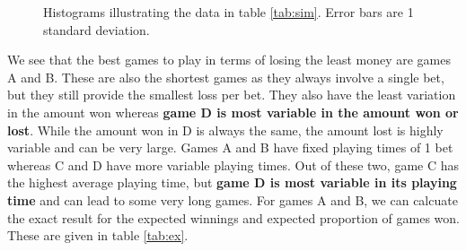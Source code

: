 \documentclass[12pt]{article}\usepackage[]{graphicx}\usepackage[]{color}
\newenvironment{knitrout}{}{} %
\begin{document}
\begin{figure}[h!]
\begin{knitrout}
\end{knitrout}
\caption{Histograms illustrating the data in table \ref{tab:sim}. Error bars are 1 standard deviation.}
\label{fig:hists}
\end{figure}

We see that the best games to play in terms of losing the least money are games A and B. These are also the shortest games as they always involve a single bet, but they still provide the smallest loss per bet. They also have the least variation in the amount won whereas \textbf{game D is most variable in the amount won or lost}. While the amount won in D is always the same, the amount lost is highly variable and can be very large. Games A and B have fixed playing times of 1 bet whereas C and D have more variable playing times. Out of these two, game C has the highest average playing time, but \textbf{game D is most variable in its playing time} and can lead to some very long games.
For games A and B, we can calcuate the exact result for the expected winnings and expected proportion of games won. These are given in table \ref{tab:ex}.
\end{document}
